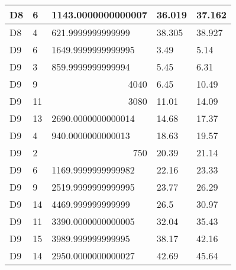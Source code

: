 \begin{longtable}{|l|l|l|l|l|}
D8 & 6 & 1143.0000000000007 & 36.019 & 37.162 \\ \hline
D8 & 4 & 621.9999999999999 & 38.305 & 38.927 \\ \hline
D9 & 6 & 1649.9999999999995 & 3.49 & 5.14 \\ \hline
D9 & 3 & 859.9999999999994 & 5.45 & 6.31 \\ \hline
D9 & 9 & \multicolumn{1}{r|}{4040} & 6.45 & 10.49 \\ \hline
D9 & 11 & \multicolumn{1}{r|}{3080} & 11.01 & 14.09 \\ \hline
D9 & 13 & 2690.0000000000014 & 14.68 & 17.37 \\ \hline
D9 & 4 & 940.0000000000013 & 18.63 & 19.57 \\ \hline
D9 & 2 & \multicolumn{1}{r|}{750} & 20.39 & 21.14 \\ \hline
D9 & 6 & 1169.9999999999982 & 22.16 & 23.33 \\ \hline
D9 & 9 & 2519.9999999999995 & 23.77 & 26.29 \\ \hline
D9 & 14 & 4469.999999999999 & 26.5 & 30.97 \\ \hline
D9 & 11 & 3390.0000000000005 & 32.04 & 35.43 \\ \hline
D9 & 15 & 3989.999999999995 & 38.17 & 42.16 \\ \hline
D9 & 14 & 2950.0000000000027 & 42.69 & 45.64 \\ \hline
\end{longtable}
\pagebreak